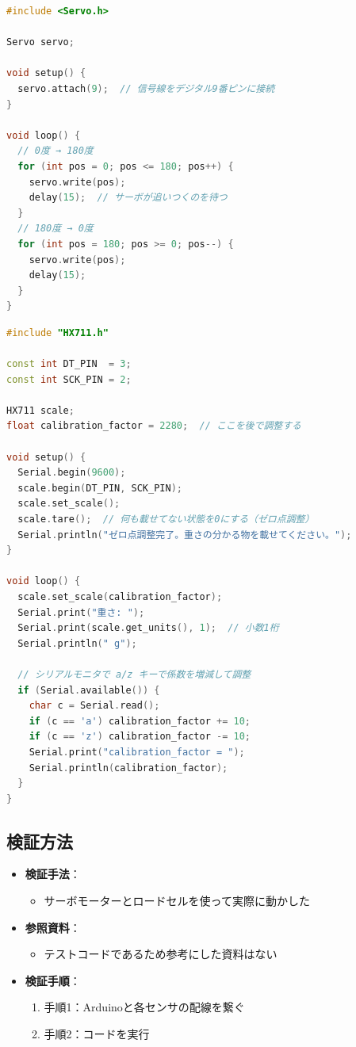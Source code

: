 \documentclass[a4paper,12pt]{ltjsarticle}
\begin{document}
\begin{lstlisting}[language=C++, caption=サーボモーター用テストコード, label={code:servo}]
#include <Servo.h>

Servo servo;

void setup() {
  servo.attach(9);  // 信号線をデジタル9番ピンに接続
}

void loop() {
  // 0度 → 180度
  for (int pos = 0; pos <= 180; pos++) {
    servo.write(pos);
    delay(15);  // サーボが追いつくのを待つ
  }
  // 180度 → 0度
  for (int pos = 180; pos >= 0; pos--) {
    servo.write(pos);
    delay(15);
  }
}
\end{lstlisting}

\begin{lstlisting}[language=C++, caption=ロードセル用テストコード, label={code:load}]
#include "HX711.h"

const int DT_PIN  = 3;
const int SCK_PIN = 2;

HX711 scale;
float calibration_factor = 2280;  // ここを後で調整する

void setup() {
  Serial.begin(9600);
  scale.begin(DT_PIN, SCK_PIN);
  scale.set_scale();
  scale.tare();  // 何も載せてない状態を0にする（ゼロ点調整）
  Serial.println("ゼロ点調整完了。重さの分かる物を載せてください。");
}

void loop() {
  scale.set_scale(calibration_factor);
  Serial.print("重さ: ");
  Serial.print(scale.get_units(), 1);  // 小数1桁
  Serial.println(" g");

  // シリアルモニタで a/z キーで係数を増減して調整
  if (Serial.available()) {
    char c = Serial.read();
    if (c == 'a') calibration_factor += 10;
    if (c == 'z') calibration_factor -= 10;
    Serial.print("calibration_factor = ");
    Serial.println(calibration_factor);
  }
}
\end{lstlisting}

\subsection{検証方法}

\begin{itemize}
  \item \textbf{検証手法}：
    \begin{itemize}
      \item サーボモーターとロードセルを使って実際に動かした
    \end{itemize}
  \item \textbf{参照資料}：
    \begin{itemize}
      \item テストコードであるため参考にした資料はない
    \end{itemize}
  \item \textbf{検証手順}：
    \begin{enumerate}
      \item 手順1：Arduinoと各センサの配線を繋ぐ
      \item 手順2：コードを実行
    \end{enumerate}
\end{itemize}
\end{document}
